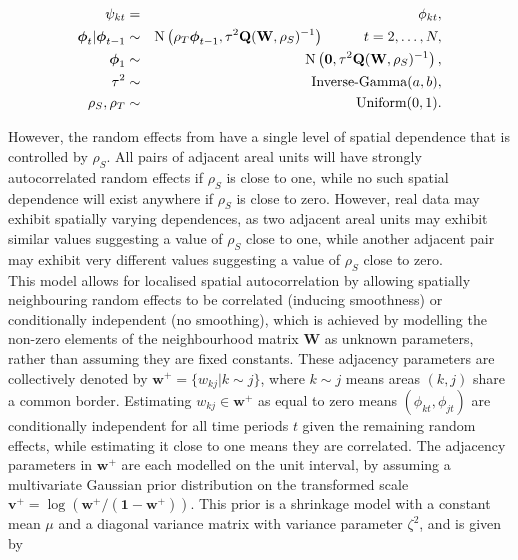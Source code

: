\documentclass[article, nojss]{jss}
\newcommand{\bd}[1]{\ensuremath{\mbox{\boldmath $#1$}}}
\begin{document}
\begin{eqnarray}
\psi_{kt}&=&\phi_{kt},\label{caradaptive1}\\
\bd{\phi}_t|\bd{\phi}_{t-1} & \sim & \mbox{N}\left(\rho_T\bd{\phi}_{t-1}, \tau^{2} \mathbf{Q}(\mathbf{W},\rho_S)^{-1}\right)\hspace{1cm} t=2,\ldots,N,\nonumber\\
\bd{\phi}_1 & \sim & \mbox{N}\left(\mathbf{0}, \tau^{2} \mathbf{Q}(\mathbf{W},\rho_S)^{-1}\right),\nonumber\\
\tau^2&\sim&\mbox{Inverse-Gamma}(a,b),\nonumber\\
\rho_S,\rho_T&\sim&\mbox{Uniform}(0,1).\nonumber
\end{eqnarray}


However, the random effects from   have a single level of spatial dependence that is controlled by $\rho_S$. All pairs of adjacent areal units will have strongly autocorrelated random effects if $\rho_S$ is close to one, while no such spatial dependence will exist anywhere if $\rho_S$ is close to zero. However, real data may exhibit spatially varying dependences, as two adjacent areal units may exhibit similar values suggesting a value of $\rho_S$ close to one, while another adjacent pair may exhibit very different values suggesting a value of $\rho_S$ close to zero.\\

This model allows for localised spatial autocorrelation by allowing spatially neighbouring  random effects to be correlated (inducing smoothness) or conditionally independent (no smoothing), which is  achieved by modelling the non-zero elements of the neighbourhood matrix $\mathbf{W}$  as unknown parameters, rather than assuming they are fixed constants. These adjacency parameters are collectively denoted by $\mathbf{w}^{+}=\{w_{kj}|k\sim j\}$, where $k\sim j$ means areas $(k,j)$ share a common border. Estimating $w_{kj}\in\mathbf{w}^{+}$ as equal to zero means $(\phi_{kt}, \phi_{jt})$  are conditionally independent for all time periods $t$  given the remaining random effects, while estimating it close to one means they are correlated. The adjacency parameters in $\mathbf{w}^{+}$ are each modelled on the unit interval, by assuming a multivariate Gaussian prior distribution on the transformed scale $\mathbf{v}^+ = \log\left(\mathbf{w}^{+}/(\mathbf{1} - \mathbf{w}^{+}) \right)$.  This prior is a shrinkage model with a constant mean $\mu$ and a diagonal variance matrix with variance parameter $\zeta^2$, and is given by
\end{document}
